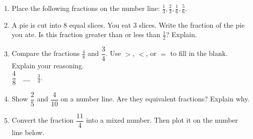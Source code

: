 \documentclass[12pt]{article}
\begin{document}
\begin{tcolorbox}[colframe=black!60, colback=white, 
coltitle=black, colbacktitle=black!15, fonttitle=\bfseries\Large, 
title=Problems, halign title=center, left=10pt, right=10pt, top=10pt, bottom=60pt]
\begin{enumerate}[start=9, itemsep=6em]
    \item Place the following fractions on the number line: \(\displaystyle\frac{1}{3}, \frac{2}{3}, \frac{1}{6}, \frac{5}{6}\).

   \begin{center}
\end{center}


    \item A pie is cut into \(8\) equal slices. You eat \(3\) slices. Write the fraction of the pie you ate. Is this fraction greater than or less than \(\displaystyle\frac{1}{2}\)? Explain.
    \item Compare the fractions \(\displaystyle\frac{4}{8}\) and \(\dfrac{3}{4}\). Use \(>\), \(<\), or \(=\) to fill in the blank. Explain your reasoning. \vspace{0.5cm}\\ \(\dfrac{4}{8} \quad \_\_\_\quad \frac{3}{4}\).
    
    \item Show \(\dfrac{2}{5}\) and \(\dfrac{4}{10}\) on a number line. Are they equivalent fractions? Explain why.
    \item Convert the fraction \(\dfrac{11}{4}\) into a mixed number. Then plot it on the number line below.

    \begin{center}
    \end{center}
\end{enumerate}
\end{tcolorbox}
\end{document}
